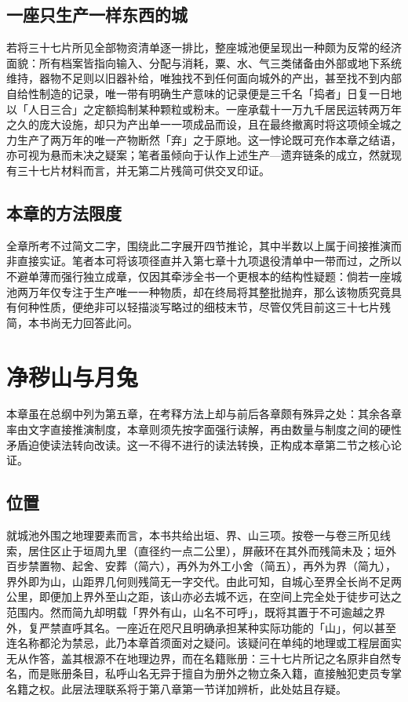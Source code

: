 \section{一座只生产一样东西的城}

若将三十七片所见全部物资清单逐一排比，整座城池便呈现出一种颇为反常的经济面貌：所有档案皆指向输入、分配与消耗，粟、水、气三类储备由外部或地下系统维持，器物不足则以旧器补给，唯独找不到任何面向城外的产出，甚至找不到内部自给性制造的记录，唯一带有明确生产意味的记录便是三千名「捣者」日复一日地以「人日三合」之定额捣制某种颗粒或粉末。一座承载十一万九千居民运转两万年之久的庞大设施，却只为产出单一一项成品而设，且在最终撤离时将这项倾全城之力生产了两万年的唯一产物断然「弃」之于原地。这一悖论既可充作本章之结语，亦可视为悬而未决之疑案；笔者虽倾向于认作上述生产—遗弃链条的成立，然就现有三十七片材料而言，并无第二片残简可供交叉印证。

\section{本章的方法限度}

全章所考不过简文二字，围绕此二字展开四节推论，其中半数以上属于间接推演而非直接实证。笔者本可将该项径直并入第七章十九项退役清单中一带而过，之所以不避单薄而强行独立成章，仅因其牵涉全书一个更根本的结构性疑题：倘若一座城池两万年仅专注于生产唯一一种物质，却在终局将其整批抛弃，那么该物质究竟具有何种性质，便绝非可以轻描淡写略过的细枝末节，尽管仅凭目前这三十七片残简，本书尚无力回答此问。

\chapter{净秽山与月兔}

本章虽在总纲中列为第五章，在考释方法上却与前后各章颇有殊异之处：其余各章率由文字直接推演制度，本章则须先按字面强行读解，再由数量与制度之间的硬性矛盾迫使读法转向改读。这一不得不进行的读法转换，正构成本章第二节之核心论证。

\section{位置}

就城池外围之地理要素而言，本书共给出垣、界、山三项。按卷一与卷三所见线索，居住区止于垣周九里（直径约一点二公里），屏蔽环在其外而残简未及；垣外百步禁置物、起舍、安葬（简六），再外为外工小舍（简五），再外为界（简九），界外即为山，山距界几何则残简无一字交代。由此可知，自城心至界全长尚不足两公里，即便加上界外至山之距，该山亦必去城不远，在空间上完全处于徒步可达之范围内。然而简九却明载「界外有山，山名不可呼」，既将其置于不可逾越之界外，复严禁直呼其名。一座近在咫尺且明确承担某种实际功能的「山」，何以甚至连名称都沦为禁忌，此乃本章首须面对之疑问。该疑问在单纯的地理或工程层面实无从作答，盖其根源不在地理边界，而在名籍账册：三十七片所记之名原非自然专名，而是账册条目，私呼山名无异于擅自为册外之物立条入籍，直接触犯吏员专掌名籍之权。此层法理联系将于第八章第一节详加辨析，此处姑且存疑。

